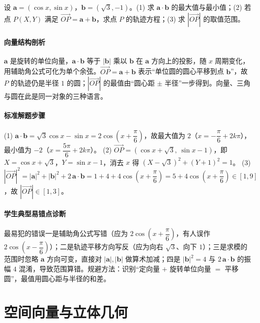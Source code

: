 \begin{problem}
设 $\bm a=(\cos x,\sin x)$，$\bm b=(\sqrt3,-1)$。(1) 求 $\bm a\cdot\bm b$ 的最大值与最小值；(2) 若点 $P(X,Y)$ 满足 $\overrightarrow{OP}=\bm a+\bm b$，求点 $P$ 的轨迹方程；(3) 求 $|\overrightarrow{OP}|$ 的取值范围。
\end{problem}
\begin{solution}
\paragraph{向量结构剖析}
$\bm a$ 是旋转的单位向量，$\bm a\cdot\bm b$ 等于 $|\bm b|$ 乘以 $\bm b$ 在 $\bm a$ 方向上的投影，随 $x$ 周期变化，用辅助角公式可化为单个余弦。$\overrightarrow{OP}=\bm a+\bm b$ 表示“单位圆的圆心平移到点 $\bm b$”，故 $P$ 的轨迹仍是半径 $1$ 的圆；$|\overrightarrow{OP}|$ 的最值由“圆心距 $\pm$ 半径”一步得到。向量、三角与圆在此是同一对象的三种语言。
\paragraph{标准解题步骤}
(1) $\bm a\cdot\bm b=\sqrt3\cos x-\sin x=2\cos\left(x+\dfrac{\pi}{6}\right)$，故最大值为 $2$（$x=-\dfrac{\pi}{6}+2k\pi$），最小值为 $-2$（$x=\dfrac{5\pi}{6}+2k\pi$）。
(2) $\overrightarrow{OP}=(\cos x+\sqrt3,\ \sin x-1)$，即 $X=\cos x+\sqrt3$，$Y=\sin x-1$，消去 $x$ 得 $(X-\sqrt3)^2+(Y+1)^2=1$。
(3) $|\overrightarrow{OP}|^2=|\bm a|^2+|\bm b|^2+2\,\bm a\cdot\bm b=1+4+4\cos\left(x+\dfrac{\pi}{6}\right)=5+4\cos\left(x+\dfrac{\pi}{6}\right)\in[1,9]$，故 $|\overrightarrow{OP}|\in[1,3]$。
\paragraph{学生典型易错点诊断}
最易犯的错误一是辅助角公式写错（应为 $2\cos\left(x+\dfrac{\pi}{6}\right)$，有人误作 $2\cos\left(x-\dfrac{\pi}{6}\right)$）；二是轨迹平移方向写反（应为向右 $\sqrt3$、向下 $1$）；三是求模的范围时忽略 $\bm a$ 方向可变，直接对 $|\bm a|,|\bm b|$ 做算术加减；四是 $|\bm b|^2=4$ 与 $2\,\bm a\cdot\bm b$ 的振幅 $4$ 混淆，导致范围算错。规避方法：识别“定向量 $+$ 旋转单位向量 $=$ 平移圆”，最值用圆心距与半径的和差。
\end{solution}

\section{空间向量与立体几何}

